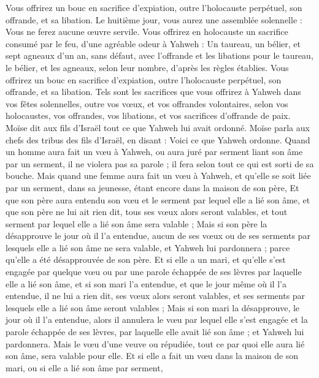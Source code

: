 \begin{multicols}{2}
Vous offrirez un bouc en sacrifice d'expiation, outre l'holocauste perpétuel, son offrande, et sa libation.
Le huitième jour, vous aurez une assemblée solennelle : Vous ne ferez aucune œuvre servile.
Vous offrirez en holocauste un sacrifice consumé par le feu, d'une agréable odeur à Yahweh : Un taureau, un bélier, et sept agneaux d'un an, sans défaut,
avec l'offrande et les libations pour le taureau, le bélier, et les agneaux, selon leur nombre, d'après les règles établies.
Vous offrirez un bouc en sacrifice d'expiation, outre l'holocauste perpétuel, son offrande, et sa libation.
Tels sont les sacrifices que vous offrirez à Yahweh dans vos fêtes solennelles, outre vos vœux, et vos offrandes volontaires, selon vos holocaustes, vos offrandes, vos libations, et vos sacrifices d'offrande de paix.
\VerseOne{}Moïse dit aux fils d'Israël tout ce que Yahweh lui avait ordonné.
Moïse parla aux chefs des tribus des fils d'Israël, en disant : Voici ce que Yahweh ordonne.
Quand un homme aura fait un vœu à Yahweh, ou aura juré par serment liant son âme par un serment, il ne violera pas sa parole ; il fera selon tout ce qui est sorti de sa bouche.
Mais quand une femme aura fait un vœu à Yahweh, et qu'elle se soit liée par un serment, dans sa jeunesse, étant encore dans la maison de son père,
Et que son père aura entendu son vœu et le serment par lequel elle a lié son âme, et que son père ne lui ait rien dit, tous ses vœux alors seront valables, et tout serment par lequel elle a lié son âme sera valable ;
Mais si son père la désapprouve le jour où il l'a entendue, aucun de ses vœux ou de ses serments par lesquels elle a lié son âme ne sera valable, et Yahweh lui pardonnera ; parce qu'elle a été désapprouvée de son père.
Et si elle a un mari, et qu'elle s'est engagée par quelque vœu ou par une parole échappée de ses lèvres par laquelle elle a lié son âme,
et si son mari l'a entendue, et que le jour même où il l'a entendue, il ne lui a rien dit, ses vœux alors seront valables, et ses serments par lesquels elle a lié son âme seront valables ;
Mais si son mari la désapprouve, le jour où il l'a entendue, alors il annulera le vœu par lequel elle s'est engagée et la parole échappée de ses lèvres, par laquelle elle avait lié son âme ; et Yahweh lui pardonnera.
Mais le vœu d'une veuve ou répudiée, tout ce par quoi elle aura lié son âme, sera valable pour elle.
Et si elle a fait un vœu dans la maison de son mari, ou si elle a lié son âme par serment,

\end{multicols}
